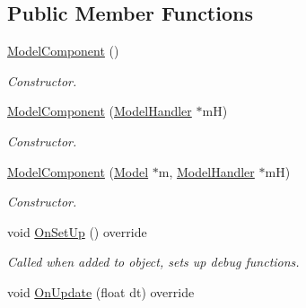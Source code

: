 \subsection*{Public Member Functions}
\begin{DoxyCompactItemize}
\item 
\hypertarget{class_model_component_a82182f738137f91b12cd90624ca7e458}{\hyperlink{class_model_component_a82182f738137f91b12cd90624ca7e458}{Model\+Component} ()}\label{class_model_component_a82182f738137f91b12cd90624ca7e458}

\begin{DoxyCompactList}\small\item\em Constructor. \end{DoxyCompactList}\item 
\hypertarget{class_model_component_a800de6ef05fdce0cd3d1be040a4840f2}{\hyperlink{class_model_component_a800de6ef05fdce0cd3d1be040a4840f2}{Model\+Component} (\hyperlink{class_model_handler}{Model\+Handler} $\ast$m\+H)}\label{class_model_component_a800de6ef05fdce0cd3d1be040a4840f2}

\begin{DoxyCompactList}\small\item\em Constructor. \end{DoxyCompactList}\item 
\hypertarget{class_model_component_ab42e7d87a85f8da41d9cc029b324af89}{\hyperlink{class_model_component_ab42e7d87a85f8da41d9cc029b324af89}{Model\+Component} (\hyperlink{class_model}{Model} $\ast$m, \hyperlink{class_model_handler}{Model\+Handler} $\ast$m\+H)}\label{class_model_component_ab42e7d87a85f8da41d9cc029b324af89}

\begin{DoxyCompactList}\small\item\em Constructor. \end{DoxyCompactList}\item 
\hypertarget{class_model_component_ac8474d853392a16c6879fdf1bfe6597f}{void \hyperlink{class_model_component_ac8474d853392a16c6879fdf1bfe6597f}{On\+Set\+Up} () override}\label{class_model_component_ac8474d853392a16c6879fdf1bfe6597f}

\begin{DoxyCompactList}\small\item\em Called when added to object, sets up debug functions. \end{DoxyCompactList}\item 
\hypertarget{class_model_component_a5def59776319943854fb5da3dc515051}{void \hyperlink{class_model_component_a5def59776319943854fb5da3dc515051}{On\+Update} (float dt) override}\label{class_model_component_a5def59776319943854fb5da3dc515051}


\end{DoxyCompactItemize}
